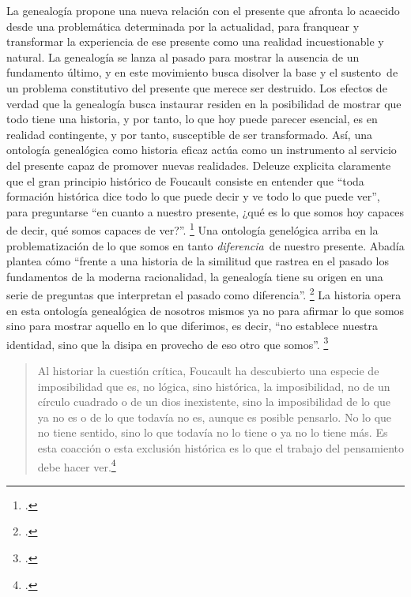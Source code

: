 La genealogía propone una nueva relación con el presente que afronta lo acaecido desde una problemática determinada por la actualidad, para franquear y transformar la experiencia de ese presente como una realidad incuestionable y natural. La genealogía se lanza al pasado para mostrar la ausencia de un fundamento último, y en este movimiento busca disolver la base y el sustento~de un problema constitutivo del presente que merece ser destruido. Los efectos de verdad que la genealogía busca instaurar residen en la posibilidad de mostrar que todo tiene una historia, y por tanto, lo que hoy puede parecer esencial, es en realidad contingente, y por tanto, susceptible de ser transformado. Así, una ontología genealógica como historia eficaz actúa como un instrumento al servicio del presente capaz de promover nuevas realidades. Deleuze explicita claramente que el gran principio histórico de Foucault consiste en entender que \enquote{toda formación histórica dice todo lo que puede decir y ve todo lo que puede ver}, para preguntarse \enquote{en cuanto a nuestro presente, ¿qué es lo que somos hoy capaces de decir, qué somos capaces de ver?}. \footcite[][157]{@7047-FOUCAULT2008} Una ontología genelógica arriba en la problematización de lo que somos en tanto \emph{diferencia}~de nuestro presente. Abadía plantea cómo \enquote{frente a una historia de la similitud que rastrea en el pasado los fundamentos de la moderna racionalidad, la genealogía tiene su origen en una serie de preguntas que interpretan el pasado como diferencia}. \footcite[][86]{@7058-MOROABADIA2006} La historia opera en esta ontología genealógica de nosotros mismos ya no para afirmar lo que somos sino para mostrar aquello en lo que diferimos, es decir, \enquote{no establece nuestra identidad, sino que la disipa en provecho de eso otro que somos}. \footcite[][154]{@7047-FOUCAULT2008}

\begin{quote}
Al historiar la cuestión crítica, Foucault ha descubierto una especie de imposibilidad que es, no lógica, sino histórica, la imposibilidad, no de un círculo cuadrado o de un dios inexistente, sino la imposibilidad de lo que ya no es o de lo que todavía no es, aunque es posible pensarlo. No lo que no tiene sentido, sino lo que todavía no lo tiene o ya no lo tiene más. Es esta coacción o esta exclusión histórica es lo que el trabajo del pensamiento debe hacer ver.\footcite[][216]{@7057-RAJCHMAN1990}
\end{quote}

